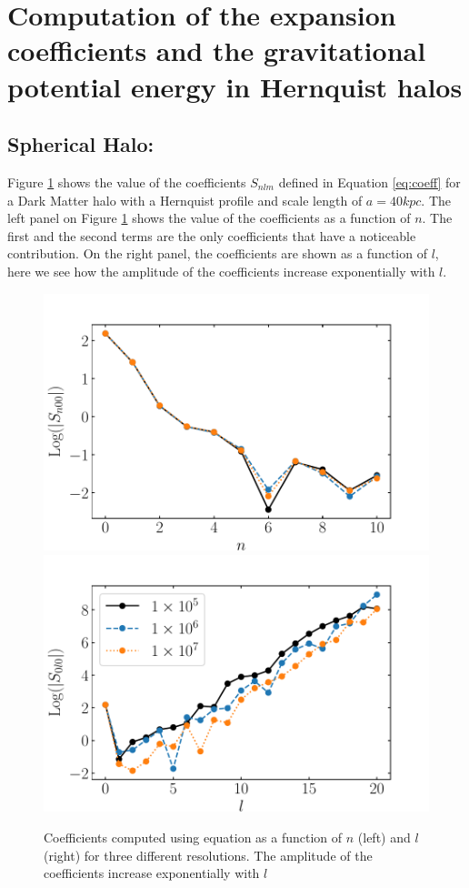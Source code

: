 \documentclass[14pt]{article}
\begin{document}
\section{Computation of the expansion coefficients and the gravitational
potential energy in Hernquist halos}


\subsection{Spherical Halo:}

Figure \ref{fig:coeff_hernquist} shows the value of the coefficients $S_{nlm}$
defined in Equation \ref{eq:coeff} for a Dark
Matter halo with a Hernquist profile and scale length of $a= 40 kpc$. The left
panel on Figure \ref{fig:coeff_hernquist} shows the value of the
coefficients as a function of $n$. The first and the second terms are the
only coefficients that have a noticeable contribution. On the right panel, the
coefficients are shown as a function of $l$, here we see how the amplitude of
the coefficients increase exponentially with $l$. 

\begin{figure}[H]
  \centering
  \includegraphics[scale=0.5]{../code/S_n_henrquist.pdf}
  \includegraphics[scale=0.5]{../code/S_l_henrquist.pdf}
  \caption{Coefficients computed using equation \label{eq:coeff} as a function
  of $n$ (left) and $l$ (right) for three different resolutions. The amplitude of the coefficients increase
  exponentially with $l$} \label{fig:coeff_hernquist}
\end{figure}
\end{document}
